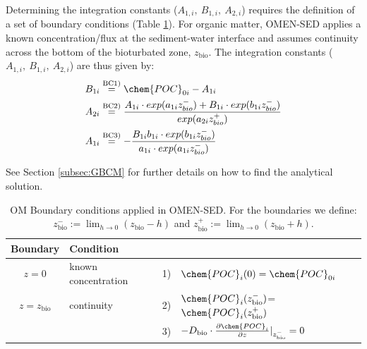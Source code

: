 \documentclass[gmd, manuscript]{copernicus}
\begin{document}
Determining the integration constants ($A_{1,i},\ B_{1,i},\ A_{2,i}$) requires the definition of a set of boundary conditions (Table \ref{Tab:BC_OM}). 
For organic matter, OMEN-SED applies a known concentration/flux at the sediment-water interface and assumes continuity across the bottom of the bioturbated zone, $z_{\mathrm{bio}}$. 
The integration constants ($A_{1,i},\ B_{1,i},\ A_{2,i}$) are thus given by:
\begin{align}
B_{1i} &\overset{\mathrm{BC 1)}}{=} \chem{POC}_{0i} - A_{1i} \label{POC_IntConst_B1i}\\
A_{2i} &\overset{\mathrm{BC 2)}}{=} \frac{A_{1i}\cdot exp(a_{1i} z_{bio}^-)+B_{1i}\cdot exp(b_{1i} z_{bio}^-)}{exp(a_{2i} z_{bio}^+)}\notag\\
A_{1i} &\overset{\mathrm{BC 3)}}{=} - \frac{B_{1i}b_{1i}\cdot exp(b_{1i} z_{bio}^-)}{a_{1i} \cdot exp(a_{1i} z_{bio}^-)}\notag
\end{align}


See Section \ref{subsec:GBCM} for further details on how to find the analytical solution.

\begin{table}[tbp]
\caption{OM Boundary conditions applied in OMEN-SED. For the boundaries we define:  $z_{\mathrm{bio}}^- := \lim_{h\to0} (z_{\mathrm{bio}}-h)$ and $z_{\mathrm{bio}}^+ := \lim_{h\to0} (z_{\mathrm{bio}}+h)$.}
\centering
\begin{tabular}{ |c| l| c l|}
\hline
\textbf{Boundary}& \textbf{Condition}& &\\
\hline
$z=0$& known concentration& 1)& $\chem{POC}_i(0)=\chem{POC}_{0i}$\\
$z=z_{\mathrm{bio}}$&continuity& 2)& $\chem{POC}_i(z_{\mathrm{bio}}^-)$=$\chem{POC}_i(z_{\mathrm{bio}}^+)$\\
               &&3)&$-D_{\mathrm{bio}}\cdot \frac{\partial \chem{POC}_i}{\partial z}|_{z_{\mathrm{bio}}^-}=0$\\
\hline
\end{tabular}
\label{Tab:BC_OM}
\end{table}
\end{document}
